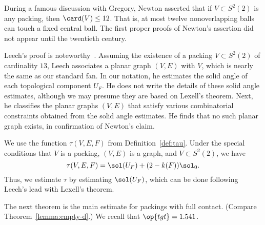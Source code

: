 \begin{remark}
During a famous discussion with Gregory, Newton asserted that 
if $V\subset S^2(2)$ is any packing, then $\card(V)\le 12$. That is, at most
twelve nonoverlapping balls can touch a fixed central ball.  The first proper
proofs of Newton's assertion did not appear until the twentieth century.
%
%
%
%
  
 Leech's proof is
noteworthy~\cite{Leech:1956:MG}.  Assuming the existence of a packing
$V\subset S^2(2)$ of cardinality $13$, Leech associates a planar graph
$(V,E)$ with $V$, which is nearly the same as our standard fan.  In
our notation, he estimates the solid angle of each topological
component $U_F$.  He does not write the details of these solid angle
estimates, although we may presume they are based on Lexell's theorem.
Next, he classifies the planar graphs $(V,E)$ that satisfy various
combinatorial constraints obtained from the solid angle estimates. He
finds that no such planar graph exists, in confirmation of Newton's
claim.
\end{remark}

We use the function $\tau(V,E,F)$ from Definition~\ref{def:tau}.  Under the 
special conditions that 
$V$ is a packing, $(V,E)$ is a  graph, and
$V\subset S^2(2)$, we have 
\[
\tau(V,E,F) = \sol(U_F) + (2-k(F)) \sol_0.
\]
Thus, we estimate $\tau$ by estimating $\sol(U_F)$, which can be done
following Leech's lead with Lexell's theorem.



The next theorem is the main estimate for packings with full contact.
(Compare  Theorem~\ref{lemma:empty-d}.)  
We recall that $\op{tgt}=1.541$.
%
%


